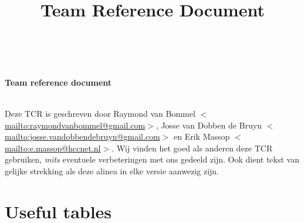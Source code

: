 \documentclass[10pt,a4paper,titlepage]{article}
\title{Team Reference Document}
\author{ \\ }
\begin{document}
   \begin{center}
      \Large\textbf{Team reference document}\\
      \Large\textit{ \\ }
   \end{center}


\begin{multicols}{2}
\tableofcontents
\end{multicols}


Deze TCR is geschreven door Raymond van Bommel $<$\url{mailto:raymondvanbommel@gmail.com}$>$, Josse van Dobben de Bruyn $<$\url{mailto:josse.vandobbendebruyn@gmail.com}$>$ en Erik Massop $<$\url{mailto:e.massop@hccnet.nl}$>$. Wij vinden het goed als anderen deze TCR gebruiken, \emph{mits} eventuele verbeteringen met ons gedeeld zijn. Ook dient tekst van gelijke strekking als deze alinea in elke versie aanwezig zijn.

\pagebreak
\section{Useful tables}
\end{document}
